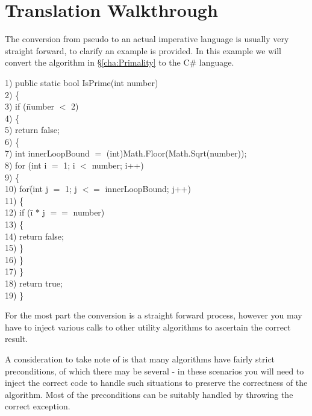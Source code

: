 \chapter{Translation Walkthrough}
The conversion from pseudo to an actual imperative language is usually very straight forward, to clarify an example is provided.
In this example we will convert the algorithm in \S\ref{cha:Primality} to the C\# language.

\begin{tabbing}
1) pub\=lic static bool IsPrime(int number) \\
2) \{ \\
3) \> if (\=number $<$ 2) \\
4) \> \{ \\
5) \> \> return false; \\
6) \> \{ \\ 
7) \> int innerLoopBound $=$ (int)Math.Floor(Math.Sqrt(number)); \\
8) \> for (int i $=$ 1; i $<$ number; i++) \\
9) \> \{ \\
10) \> \> for\= (int j $=$ 1; j $<=$ innerLoopBound; j++) \\
11) \> \> \{ \\
12) \> \> \> if (\=i $*$ j $==$ number) \\
13) \> \> \> \{ \\
14) \> \> \> \> return false; \\
15) \> \> \> \} \\
16) \> \> \} \\
17) \> \} \\
18) \> return true; \\
19) \} \\
\end{tabbing}

For the most part the conversion is a straight forward process, however you may have to inject various calls to other utility algorithms to ascertain the correct result.

A consideration to take note of is that many algorithms have fairly strict preconditions, of which there may be several - in these scenarios you will need to inject the correct code to handle such situations to preserve the correctness of the algorithm. Most of the preconditions can be suitably handled by throwing the correct exception.
